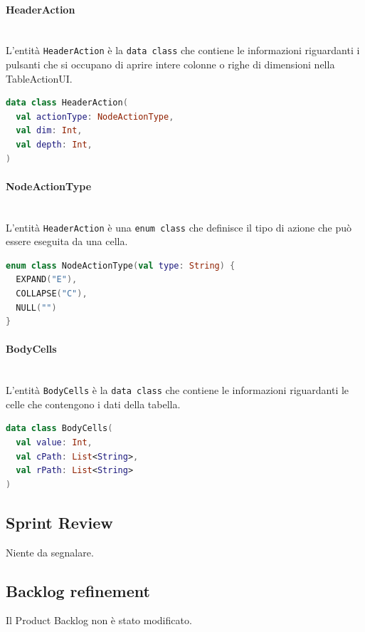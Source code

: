 \paragraph*{HeaderAction} \mbox{} \\
L'entità \verb|HeaderAction| è la \verb|data class| che contiene le informazioni riguardanti i pulsanti che si occupano di aprire intere colonne o righe di dimensioni nella TableActionUI.
\begin{lstlisting}[caption={HeaderAction}, label={lst:headeraction}, language=Kotlin]
data class HeaderAction(
  val actionType: NodeActionType,
  val dim: Int,
  val depth: Int,
)
\end{lstlisting}

\paragraph*{NodeActionType} \mbox{} \\
L'entità \verb|HeaderAction| è una \verb|enum class| che definisce il tipo di azione che può essere eseguita da una cella.
\begin{lstlisting}[caption={NodeActionType}, label={lst:nodeactiontype}, language=Kotlin]
enum class NodeActionType(val type: String) {
  EXPAND("E"),
  COLLAPSE("C"),
  NULL("")
}
\end{lstlisting}

\paragraph*{BodyCells} \mbox{} \\
L'entità \verb|BodyCells| è la \verb|data class| che contiene le informazioni riguardanti le celle che contengono i dati della tabella.
\begin{lstlisting}[caption={BodyCells}, label={lst:bodycells}, language=Kotlin]
data class BodyCells(
  val value: Int,
  val cPath: List<String>,
  val rPath: List<String>
)
\end{lstlisting}

\subsection{Sprint Review}
Niente da segnalare.

\subsection{Backlog refinement}
Il Product Backlog non è stato modificato.

